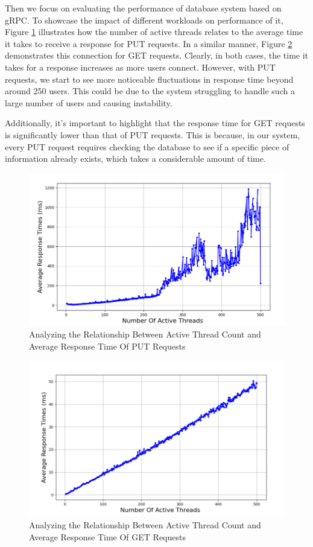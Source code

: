\documentclass[sigconf]{acmart}
\begin{document}
Then we focus on evaluating the performance of database system based on gRPC. To showcase the impact of different workloads on performance of it, Figure \ref{put} illustrates how the number of active threads relates to the average time it takes to receive a response for PUT requests. In a similar manner, Figure \ref{get} demonstrates this connection for GET requests. Clearly, in both cases, the time it takes for a response increases as more users connect. However, with PUT requests, we start to see more noticeable fluctuations in response time beyond around 250 users. This could be due to the system struggling to handle such a large number of users and causing instability.

Additionally, it's important to highlight that the response time for GET requests is significantly lower than that of PUT requests. This is because, in our system, every PUT request requires checking the database to see if a specific piece of information already exists, which takes a considerable amount of time.
\begin{figure}
    \centering
    \includegraphics[width=1\linewidth]{cloud_database_report/report/put_time_thread.png}
    \caption{Analyzing the Relationship Between Active Thread Count and Average Response Time Of PUT Requests}
    \label{put}
\end{figure}
\begin{figure}
    \centering
    \includegraphics[width=1\linewidth]{get_time_thread.png}
    \caption{Analyzing the Relationship Between Active Thread Count and Average Response Time Of GET Requests}
    \label{get}
\end{figure}
\end{document}
